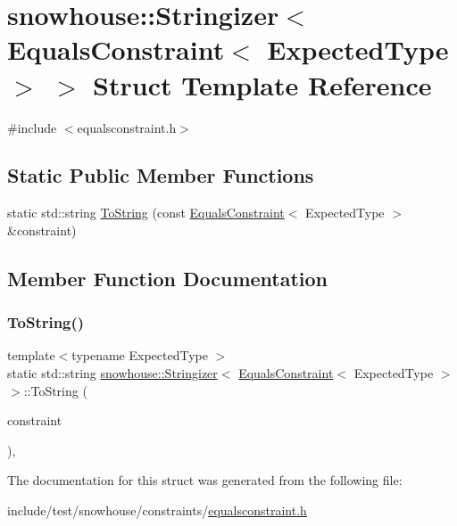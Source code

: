 \hypertarget{structsnowhouse_1_1Stringizer_3_01EqualsConstraint_3_01ExpectedType_01_4_01_4}{}\section{snowhouse\+::Stringizer$<$ Equals\+Constraint$<$ Expected\+Type $>$ $>$ Struct Template Reference}
\label{structsnowhouse_1_1Stringizer_3_01EqualsConstraint_3_01ExpectedType_01_4_01_4}


{\ttfamily \#include $<$equalsconstraint.\+h$>$}

\subsection*{Static Public Member Functions}
\begin{DoxyCompactItemize}
\item 
static std\+::string \mbox{\hyperlink{structsnowhouse_1_1Stringizer_3_01EqualsConstraint_3_01ExpectedType_01_4_01_4_a85f5d8b5d387314ffa38ac249536f946}{To\+String}} (const \mbox{\hyperlink{structsnowhouse_1_1EqualsConstraint}{Equals\+Constraint}}$<$ Expected\+Type $>$ \&constraint)
\end{DoxyCompactItemize}


\subsection{Member Function Documentation}
\mbox{\label{structsnowhouse_1_1Stringizer_3_01EqualsConstraint_3_01ExpectedType_01_4_01_4_a85f5d8b5d387314ffa38ac249536f946}} 
\subsubsection{\texorpdfstring{ToString()}{ToString()}}
{\footnotesize\ttfamily template$<$typename Expected\+Type $>$ \\
static std\+::string \mbox{\hyperlink{structsnowhouse_1_1Stringizer}{snowhouse\+::\+Stringizer}}$<$ \mbox{\hyperlink{structsnowhouse_1_1EqualsConstraint}{Equals\+Constraint}}$<$ Expected\+Type $>$ $>$\+::To\+String (\begin{DoxyParamCaption}\item[{const \mbox{\hyperlink{structsnowhouse_1_1EqualsConstraint}{Equals\+Constraint}}$<$ Expected\+Type $>$ \&}]{constraint }\end{DoxyParamCaption})\hspace{0.3cm}{\ttfamily [inline]}, {\ttfamily [static]}}



The documentation for this struct was generated from the following file\+:\begin{DoxyCompactItemize}
\item 
include/test/snowhouse/constraints/\mbox{\hyperlink{equalsconstraint_8h}{equalsconstraint.\+h}}\end{DoxyCompactItemize}
